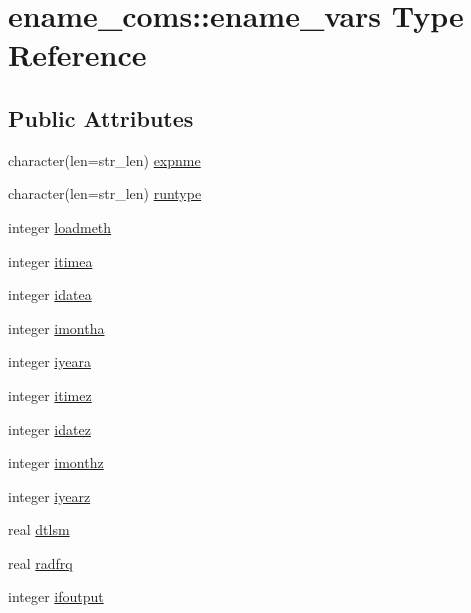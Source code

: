 \hypertarget{structename__coms_1_1ename__vars}{}\section{ename\+\_\+coms\+:\+:ename\+\_\+vars Type Reference}
\label{structename__coms_1_1ename__vars}
\subsection*{Public Attributes}
\begin{DoxyCompactItemize}
\item 
character(len=str\+\_\+len) \hyperlink{structename__coms_1_1ename__vars_a970bc05935c2ee24f02591aa0ca5457a}{expnme}
\item 
character(len=str\+\_\+len) \hyperlink{structename__coms_1_1ename__vars_ac621d47b49d6ebf3a550bde26b79cb7a}{runtype}
\item 
integer \hyperlink{structename__coms_1_1ename__vars_a5a627b7bee8641965c4634543124baee}{loadmeth}
\item 
integer \hyperlink{structename__coms_1_1ename__vars_ab6598af99bba785d39e12ec80258deb7}{itimea}
\item 
integer \hyperlink{structename__coms_1_1ename__vars_a5b5b94083eead564a2ee1c26d85d1f91}{idatea}
\item 
integer \hyperlink{structename__coms_1_1ename__vars_ac6472e55ef8ab1e7120d3f8f0852e31b}{imontha}
\item 
integer \hyperlink{structename__coms_1_1ename__vars_af845d0d3822083d1e7f6a177f0a0907a}{iyeara}
\item 
integer \hyperlink{structename__coms_1_1ename__vars_a573c1b058bf40a8e399099048da26899}{itimez}
\item 
integer \hyperlink{structename__coms_1_1ename__vars_a61075da196b2ab7a9caf2d8f2f9fe312}{idatez}
\item 
integer \hyperlink{structename__coms_1_1ename__vars_a1d8d5e815b5635c16b2c1d4b97c94820}{imonthz}
\item 
integer \hyperlink{structename__coms_1_1ename__vars_a24cd4a3c73b19d652c6fb506d4266e77}{iyearz}
\item 
real \hyperlink{structename__coms_1_1ename__vars_a6f1d7d2a35d8468688c1ce5f5ca479c7}{dtlsm}
\item 
real \hyperlink{structename__coms_1_1ename__vars_a8b31894418e581a19afed977dec99947}{radfrq}
\item 
integer \hyperlink{structename__coms_1_1ename__vars_a5fc249720f7fb1da5c7d565e8b39deaf}{ifoutput}

\end{DoxyCompactItemize}
